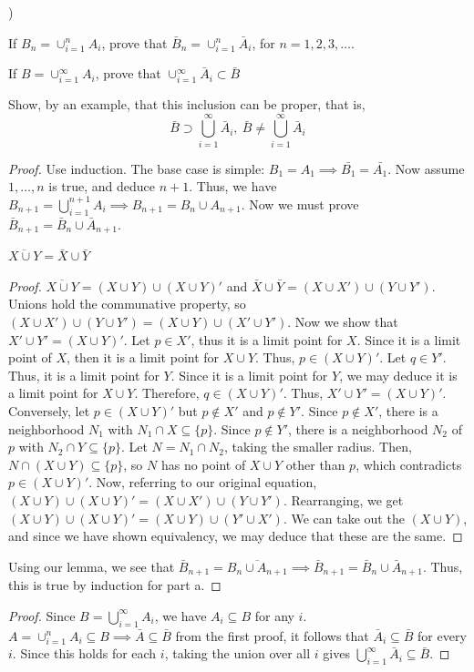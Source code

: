 \documentclass{amsart}
\newcounter{myletter}
\begin{document}
\begin{list}{)}{}
    \item If $B_n = \cup_{i=1}^n A_i$, prove that $\bar{B}_n = \cup_{i=1}^{n} \bar{A}_i$, for $n=1,2,3,\ldots$. 
    \item If $B = \cup_{i=1}^\infty A_i$, prove that $\cup_{i=1}^\infty \bar{A}_i \subset \bar{B}$
\end{list}
Show, by an example, that this inclusion can be proper, that is, 
\[ \bar{B} \supset \bigcup_{i=1}^\infty \bar{A}_i, \ \bar{B} \neq \bigcup_{i=1}^\infty \bar{A}_i \]
\begin{proof}
    Use induction. The base case is simple: $B_1 = A_1 \implies \bar{B_1} = \bar{A_1}$. Now assume $1,\ldots,n$ is true, and deduce $n+1$. Thus, we have $B_{n+1} = \bigcup_{i=1}^{n+1}A_i \implies B_{n+1} = B_{n} \cup A_{n+1}$. Now we must prove $\bar{B}_{n+1} = \bar{B}_n \cup \bar{A}_{n+1}$. 
    \begin{lemma}
        $\overline{X\cup Y} = \bar{X} \cup \bar{Y} $
    \end{lemma}
    \begin{proof}
        $\overline{X \cup Y} = (X \cup Y) \cup (X \cup Y)'$ and $\bar{X} \cup \bar{Y} = (X \cup X') \cup (Y \cup Y')$. Unions hold the communative property, so $(X \cup X') \cup (Y \cup Y') = (X \cup Y) \cup (X' \cup Y')$. Now we show that $X' \cup Y' = (X \cup Y)'$. Let $p \in X'$, thus it is a limit point for $X$. Since it is a limit point of $X$, then it is a limit point for $X \cup Y$. Thus, $p \in (X \cup Y)'$. Let $q \in Y'$. Thus, it is a limit point for $Y$. Since it is a limit point for $Y$, we may deduce it is a limit point for $X \cup Y$. Therefore, $q \in (X\cup Y)'$. Thus, $X' \cup Y' = (X\cup Y)'$. Conversely, let $p \in (X\cup Y)'$ but $p \not \in X'$ and $p \not \in Y'$. Since $p \not \in X'$, there is a neighborhood $N_1$ with $N_1 \cap X \subseteq \{p\}$. Since $p \not \in Y'$, there is a neighborhood $N_2$ of $p$ with $N_2 \cap Y \subseteq \{p\}$. Let $N = N_1 \cap N_2$, taking the smaller radius. Then, $N \cap (X \cup Y) \subseteq \{p\}$, so $N$ has no point of $X\cup Y$ other than $p$, which contradicts $p \in (X \cup Y)'$. Now, referring to our original equation, $(X\cup Y) \cup (X \cup Y)' = (X \cup X')\cup (Y \cup Y')$. Rearranging, we get $(X\cup Y) \cup (X \cup Y)' = (X \cup Y)\cup (Y' \cup X')$. We can take out the $(X \cup Y)$, and since we have shown equivalency, we may deduce that these are the same. 
    \end{proof}
    Using our lemma, we see that $\bar{B}_{n+1} = \overline{B_n \cup A_{n+1}} \implies \bar{B}_{n+1} = \bar{B}_n \cup \bar{A}_{n+1}$. Thus, this is true by induction for part a.
\end{proof}
\begin{proof}
    Since $B = \bigcup_{i=1}^\infty A_i$, we have $A_i \subseteq B$ for any $i$.  $A=\cup_{i=1}^n A_i \subseteq B \implies \bar{A} \subseteq \bar{B}$ from the first proof, it follows that $\bar{A}_i \subseteq \bar{B}$ for every $i$. Since this holds for each $i$, taking the union over all $i$ gives $
    \bigcup_{i=1}^{\infty} \bar{A}_i \subseteq \bar{B}.$
\end{proof}
\end{document}
